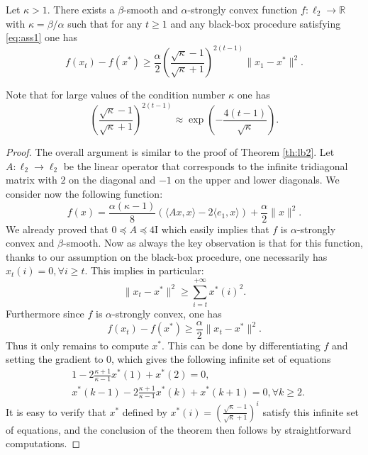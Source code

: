 \documentclass[openany]{now}
\newcommand{\mI}{\mathrm{I}}
\begin{document}
\begin{theorem} \label{th:lb3}
Let $\kappa > 1$. There exists a $\beta$-smooth and $\alpha$-strongly convex function $f: \ell_2 \rightarrow \mathbb{R}$ with $\kappa = \beta / \alpha$ such that for any $t \geq 1$ and any black-box procedure satisfying \eqref{eq:ass1} one has
$$f(x_t) - f(x^*) \geq  \frac{\alpha}{2}  \left(\frac{\sqrt{\kappa} - 1}{\sqrt{\kappa}+1}\right)^{2 (t-1)} \|x_1 - x^*\|^2 .$$
\end{theorem}

Note that for large values of the condition number $\kappa$ one has 
$$\left(\frac{\sqrt{\kappa} - 1}{\sqrt{\kappa}+1}\right)^{2 (t-1)} \approx \exp\left(- \frac{4 (t-1)}{\sqrt{\kappa}} \right) .$$

\begin{proof}
The overall argument is similar to the proof of Theorem \ref{th:lb2}. Let $A : \ell_2 \rightarrow \ell_2$ be the linear operator that corresponds to the infinite tridiagonal matrix with $2$ on the diagonal and $-1$ on the upper and lower diagonals. We consider now the following function:
$$f(x) = \frac{\alpha (\kappa-1)}{8} \left(\langle Ax, x\rangle - 2 \langle e_1, x \rangle \right) + \frac{\alpha}{2} \|x\|^2 .$$
We already proved that $0 \preceq A \preceq 4 \mI$ which easily implies that $f$ is $\alpha$-strongly convex and $\beta$-smooth. Now as always the key observation is that for this function, thanks to our assumption on the black-box procedure, one necessarily has $x_t(i) = 0, \forall i \geq t$. This implies in particular:
$$\|x_t - x^*\|^2 \geq \sum_{i=t}^{+\infty} x^*(i)^2 .$$
Furthermore since $f$ is $\alpha$-strongly convex, one has
$$f(x_t) - f(x^*) \geq \frac{\alpha}{2} \|x_t - x^*\|^2 .$$
Thus it only remains to compute $x^*$. This can be done by differentiating $f$ and setting the gradient to $0$, which gives the following infinite set of equations
\begin{align*}
& 1 - 2 \frac{\kappa+1}{\kappa-1} x^*(1) + x^*(2) = 0 , \\
& x^*(k-1) - 2 \frac{\kappa+1}{\kappa-1} x^*(k) + x^*(k+1) = 0, \forall k \geq 2 .
\end{align*}
It is easy to verify that $x^*$ defined by $x^*(i) = \left(\frac{\sqrt{\kappa} - 1}{\sqrt{\kappa} + 1}\right)^i$ satisfy this infinite set of equations, and the conclusion of the theorem then follows by straightforward computations.
\end{proof}
\end{document}
